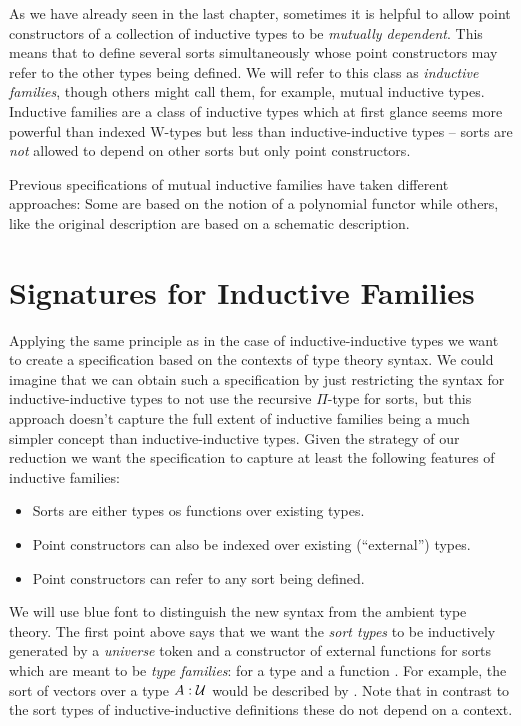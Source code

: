 
As we have already seen in the last chapter, sometimes it is helpful to allow
point constructors of a collection of inductive types to be \emph{mutually dependent}.
This means that to define several sorts simultaneously whose point constructors
may refer to the other types being defined.
We will refer to this class as \emph{inductive families}, though others might
call them, for example, mutual inductive types.
Inductive families are a class of inductive types which at first glance seems more
powerful than indexed W-types but less than inductive-inductive types --
sorts are \emph{not} allowed to depend on other sorts but only point constructors.

Previous specifications of mutual inductive families have taken different approaches:
Some are based on the notion of a polynomial functor
\citep{indexedcontainers}
while others, like
the original \citet{dybjer94} description are based on a schematic description.


\section{Signatures for Inductive Families}

Applying the same principle as in the case of inductive-inductive types we want
to create a specification based on the contexts of type theory syntax.
We could imagine that we can obtain such a specification by just restricting the
syntax for inductive-inductive types to not use the recursive $\Pi$-type for sorts,
but this approach doesn't capture the full %
extent of inductive families being a much simpler concept than inductive-inductive
types.
Given the strategy of our reduction we want the specification to capture at least
the following features of inductive families:
\begin{itemize}
\item Sorts are either types os functions over existing types.
\item Point constructors can also be indexed over existing (``external'') types.
\item Point constructors can refer to any sort being defined.
\end{itemize}

We will use {\color{Blue}blue font} to distinguish the new syntax from the ambient
type theory.
The first point above says that we want the \emph{sort types} \blm{\tqm{\Sc}}
to be inductively generated by a \emph{universe} token \tqm{\UU :: \Sc} and a constructor
of external functions for sorts which are meant to be \emph{type families}:
 for a type  and a function
.
For example, the sort of vectors over a type $A : \mathcal{U}$ would be described by
.
Note that in contrast to the sort types of inductive-inductive definitions these
do not depend on a context.

